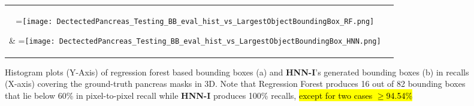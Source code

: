 \documentclass[journal]{IEEEtran}
\newcommand*{\vcenteredhbox}[1]{\begingroup\setbox0=\hbox{#1}\parbox{\wd0}{\box0}\endgroup}
\begin{document}
\begin{figure}[htb]\centering
	\begin{tabular}{cc}
			\vcenteredhbox{\texttt{[image: DectectedPancreas\_Testing\_BB\_eval\_hist\_vs\_LargestObjectBoundingBox\_RF.png]}} &
			\vcenteredhbox{\texttt{[image: DectectedPancreas\_Testing\_BB\_eval\_hist\_vs\_LargestObjectBoundingBox\_HNN.png]}} \\
			(a) regression forest & (b) \textbf{HNN-I}\\
	\end{tabular}
	\caption{\small Histogram plots (Y-Axis) of regression forest based bounding boxes (a) and \textbf{HNN-I}'s generated bounding boxes (b) in recalls (X-axis) covering the ground-truth pancreas masks in 3D. Note that Regression Forest produces 16 out of 82 bounding boxes that lie below 60\% in pixel-to-pixel recall while \textbf{HNN-I} produces 100\% recalls, \hl{except for two cases $\geq$94.54\%}}		
	\label{fig:recall_histograms}
\end{figure}
\end{document}
